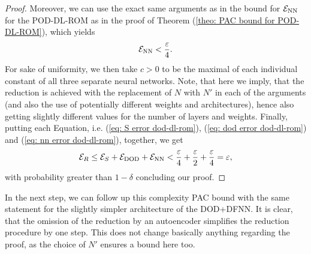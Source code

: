 \begin{proof}
    Moreover, we can use the exact same arguments as in the bound for $\mathcal{E}_{\text{NN}}$ for the POD-DL-ROM as in the
    proof of Theorem (\ref{theo: PAC bound for POD-DL-ROM}), which yields
    \begin{equation} \label{eq: nn error dod-dl-rom}
        \mathcal{E}_{\text{NN}} < \frac{\varepsilon}{4}.
    \end{equation}
    For sake of uniformity, we then take $c > 0$ to be the maximal of each individual constant of all three
    separate neural networks.
    Note, that here we imply, that the reduction is achieved with the replacement of $N$ with $N'$ in each of the 
    arguments (and also the use of potentially
    different weights and architectures), hence also getting slightly different values for the number of layers and weights.
    Finally, putting each Equation, i.e. (\ref{eq: S error dod-dl-rom}), (\ref{eq: dod error dod-dl-rom}) and (\ref{eq: nn error dod-dl-rom}),
    together, we get 
    \begin{equation*}
        \mathcal{E}_R \leq \mathcal{E}_S + \mathcal{E}_{\text{DOD}} + \mathcal{E}_{\text{NN}} < \frac{\varepsilon}{4} +  \frac{\varepsilon}{2}
        + \frac{\varepsilon}{4} = \varepsilon,
    \end{equation*}
    with probability greater than $1 - \delta$ concluding our proof.
\end{proof}


In the next step, we can follow up this complexity PAC bound with the same
statement for the slightly simpler architecture of the DOD+DFNN. It is clear, that the 
omission of the reduction by an autoencoder simplifies the reduction procedure by one step.
This does not change basically anything regarding the proof, as the choice of $N'$ ensures a bound here too.


